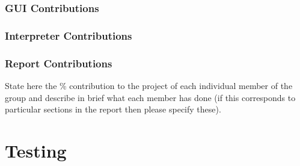 \documentclass[a4paper, oneside, 11pt]{report}
\begin{document}
    \subsection{GUI Contributions}
    \subsection{Interpreter Contributions}
    \subsection{Report Contributions}

    State here the \% contribution to the project of each individual member of the group and describe in brief what each member has done (if this corresponds to particular sections in the report then please specify these).

    \chapter{Testing}
    \label{app:test}

\end{document}
